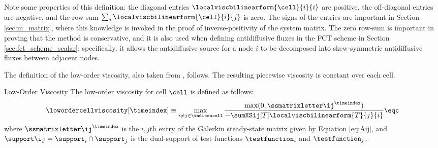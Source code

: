 Note some properties of this definition: the diagonal entries
$\localviscbilinearform{\cell}{i}{i}$ are positive, the off-diagonal entries
are negative, and the row-sum $\sum_j\localviscbilinearform{\cell}{i}{j}$
is zero. The signs of the entries are important in Section \ref{sec:m_matrix},
where this knowledge is invoked in the proof of inverse-positivity of the
system matrix. The zero row-sum is important in proving that the method
is conservative, and it is also used when defining antidiffusive fluxes
in the FCT scheme in Section \ref{sec:fct_scheme_scalar}; specifically, it
allows the antidiffusive source for a node $i$ to be decomposed into
skew-symmetric antidiffusive fluxes between adjacent nodes.

The definition of the low-order viscosity, also taken from
\cite{guermond_firstorder}, follows. The resulting piecewise
viscosity is constant over each cell.
\begin{definition}{Low-Order Viscosity}
   The low-order viscosity for cell $\cell$ is defined as follows:
   \begin{equation}
     \lowordercellviscosity[\timeindex] \equiv \max\limits_{i\ne j\in\indicescell}
     \frac{\max(0,\ssmatrixletter\ij^\timeindex)}
     {-\sumKSij[T]\localviscbilinearform{T}{j}{i}}
     \eqc
   \end{equation}
   where $\ssmatrixletter\ij^\timeindex$ is the $i,j$th entry of the Galerkin
   steady-state matrix given by Equation \eqref{eq:Aij}, and
   $\support\ij=\support_i\cap \support_j$ is the dual-support of test
   functions $\testfunction_i$ and $\testfunction_j$.
\end{definition}
